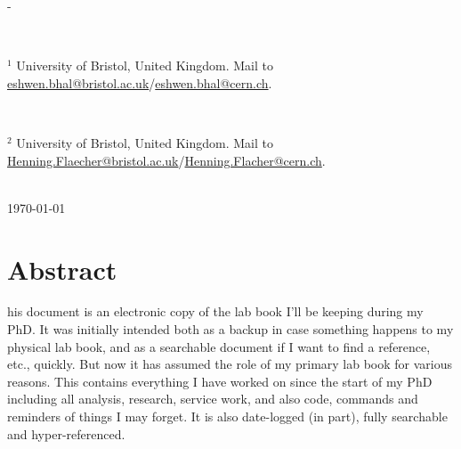 \documentclass[a4paper,12pt,leqno,openbib,oldfontcommands,oneside]{memoir} %
\begin{document}
\begin{titlingpage}
\begin{SingleSpace}
\begin{adjustwidth*}{\unitlength}{-\unitlength}
\begin{center}
\begin{minipage}{10cm}
    \

    $^{\text{1}}$ University of Bristol, United Kingdom. Mail to \href{mailto:eshwen.bhal@bristol.ac.uk}{eshwen.bhal@bristol.ac.uk}/\href{mailto:eshwen.bhal@cern.ch}{eshwen.bhal@cern.ch}.

    \

    $^{\text{2}}$ University of Bristol, United Kingdom. Mail to \href{mailto:Henning.Flaecher@bristol.ac.uk}{Henning.Flaecher@bristol.ac.uk}/\href{mailto:Henning.Flacher@cern.ch}{Henning.Flacher@cern.ch}.
  \end{minipage}\\
  \vspace{9mm}
  {\large\textsc{\today}}  %
  \vspace{12mm}
  \end{center}
  \end{adjustwidth*}
  \end{SingleSpace}
\end{titlingpage}

\chapter*{Abstract}
\begin{SingleSpace}
his document is an electronic copy of the lab book I'll be keeping during my PhD. It was initially intended both as a backup in case something happens to my physical lab book, and as a searchable document if I want to find a reference, etc., quickly. But now it has assumed the role of my primary lab book for various reasons. This contains everything I have worked on since the start of my PhD including all analysis, research, service work, and also code, commands and reminders of things I may forget. It is also date-logged (in part), fully searchable and hyper-referenced.
\end{SingleSpace}
\clearpage

\renewcommand{\contentsname}{Table of Contents}
\tableofcontents*
{}
\clearpage

\listoffigures
{}
\clearpage

\listoftables
{}
\clearpage
\end{document}
